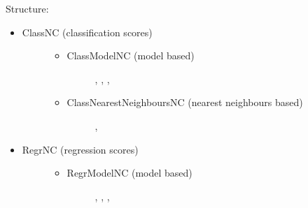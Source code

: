 \documentclass[letterpaper,10pt,english]{sphinxmanual}
\begin{document}
Structure:
\begin{itemize}
\item {} \begin{description}
\item[{ClassNC (classification scores)}] \leavevmode\begin{itemize}
\item {} \begin{description}
\item[{ClassModelNC (model based)}] \leavevmode
{\hyperref[cp.nonconformity:cp.nonconformity.InverseProbability]{}}, {\hyperref[cp.nonconformity:cp.nonconformity.ProbabilityMargin]{}}, {\hyperref[cp.nonconformity:cp.nonconformity.SVMDistance]{}},
{\hyperref[cp.nonconformity:cp.nonconformity.LOOClassNC]{}}

\end{description}

\item {} \begin{description}
\item[{ClassNearestNeighboursNC (nearest neighbours based)}] \leavevmode
{\hyperref[cp.nonconformity:cp.nonconformity.KNNDistance]{}}, {\hyperref[cp.nonconformity:cp.nonconformity.KNNFraction]{}}

\end{description}

\end{itemize}

\end{description}

\item {} \begin{description}
\item[{RegrNC (regression scores)}] \leavevmode\begin{itemize}
\item {} \begin{description}
\item[{RegrModelNC (model based)}] \leavevmode
{\hyperref[cp.nonconformity:cp.nonconformity.AbsError]{}}, {\hyperref[cp.nonconformity:cp.nonconformity.AbsErrorRF]{}} {\hyperref[cp.nonconformity:cp.nonconformity.AbsErrorNormalized]{}}, {\hyperref[cp.nonconformity:cp.nonconformity.LOORegrNC]{}},
{\hyperref[cp.nonconformity:cp.nonconformity.ErrorModelNC]{}}


\end{description}
\end{itemize}
\end{description}
\end{itemize}
\end{document}
